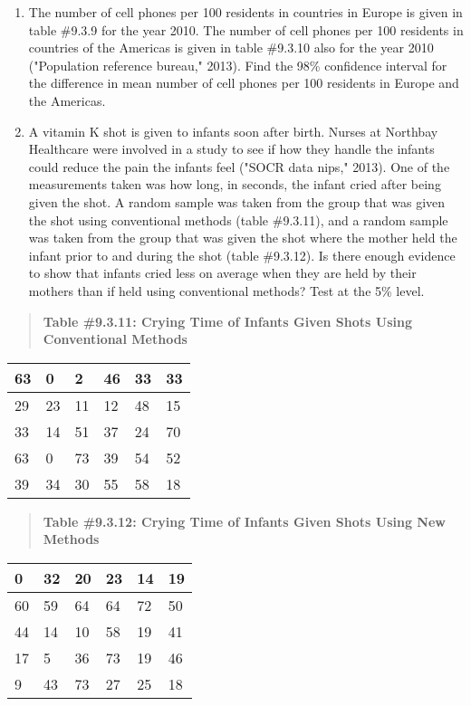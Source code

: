 \documentclass[]{book}
\begin{document}
\begin{enumerate}
\def\labelenumi{\arabic{enumi}.}
\setcounter{enumi}{7}
\item
  The number of cell phones per 100 residents in countries in Europe is given in table \#9.3.9 for the year 2010. The number of cell phones per 100 residents in countries of the Americas is given in table \#9.3.10 also for the year 2010 ("Population reference bureau," 2013). Find the 98\% confidence interval for the difference in mean number of cell phones per 100 residents in Europe and the Americas.
\item
  A vitamin K shot is given to infants soon after birth. Nurses at Northbay Healthcare were involved in a study to see if how they handle the infants could reduce the pain the infants feel ("SOCR data nips," 2013). One of the measurements taken was how long, in seconds, the infant cried after being given the shot. A random sample was taken from the group that was given the shot using conventional methods (table \#9.3.11), and a random sample was taken from the group that was given the shot where the mother held the infant prior to and during the shot (table \#9.3.12). Is there enough evidence to show that infants cried less on average when they are held by their mothers than if held using conventional methods? Test at the 5\% level.
\end{enumerate}

\begin{quote}
\textbf{Table \#9.3.11: Crying Time of Infants Given Shots Using
Conventional Methods}
\end{quote}

\begin{longtable}[]{@{}llllll@{}}
\toprule
63 & 0 & 2 & 46 & 33 & 33\tabularnewline
\midrule
\endhead
29 & 23 & 11 & 12 & 48 & 15\tabularnewline
33 & 14 & 51 & 37 & 24 & 70\tabularnewline
63 & 0 & 73 & 39 & 54 & 52\tabularnewline
39 & 34 & 30 & 55 & 58 & 18\tabularnewline
\bottomrule
\end{longtable}

\begin{quote}
\textbf{Table \#9.3.12: Crying Time of Infants Given Shots Using New
Methods}
\end{quote}

\begin{longtable}[]{@{}llllll@{}}
\toprule
0 & 32 & 20 & 23 & 14 & 19\tabularnewline
\midrule
\endhead
60 & 59 & 64 & 64 & 72 & 50\tabularnewline
44 & 14 & 10 & 58 & 19 & 41\tabularnewline
17 & 5 & 36 & 73 & 19 & 46\tabularnewline
9 & 43 & 73 & 27 & 25 & 18\tabularnewline
\bottomrule
\end{longtable}
\end{document}
